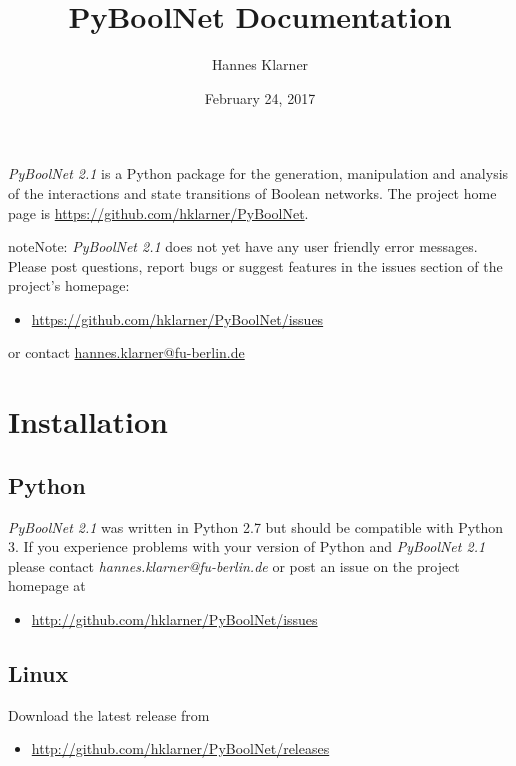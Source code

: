 \documentclass[letterpaper,10pt,english]{sphinxmanual}
\title{PyBoolNet Documentation}
\date{February 24, 2017}
\author{Hannes Klarner}
\begin{document}
\maketitle
\tableofcontents
{}\label{index::doc}
\emph{PyBoolNet 2.1} is a Python package for the generation, manipulation and analysis of the interactions and state transitions of Boolean networks.
The project home page is \href{https://github.com/hklarner/PyBoolNet}{https://github.com/hklarner/PyBoolNet}.

\begin{notice}{note}{Note:}
\emph{PyBoolNet 2.1} does not yet have any user friendly error messages.
Please post questions, report bugs or suggest features in the issues section of the project's homepage:
\begin{itemize}
\item {} 
\href{https://github.com/hklarner/PyBoolNet/issues}{https://github.com/hklarner/PyBoolNet/issues}

\end{itemize}

or contact \href{mailto:hannes.klarner@fu-berlin.de}{hannes.klarner@fu-berlin.de}
\end{notice}




\chapter{Installation}
\label{Installation:installation}\label{Installation:id1}\label{Installation::doc}\label{Installation:installation-software}

\section{Python}
\label{Installation:python}
\emph{PyBoolNet 2.1} was written in Python 2.7 but should be compatible with Python 3.
If you experience problems with your version of Python and \emph{PyBoolNet 2.1} please contact \emph{hannes.klarner@fu-berlin.de} or
post an issue on the project homepage at
\begin{itemize}
\item {} 
\href{http://github.com/hklarner/PyBoolNet/issues}{http://github.com/hklarner/PyBoolNet/issues}

\end{itemize}


\section{Linux}
\label{Installation:linux}
Download the latest release from
\begin{itemize}
\item {} 
\href{http://github.com/hklarner/PyBoolNet/releases}{http://github.com/hklarner/PyBoolNet/releases}

\end{itemize}
\end{document}
